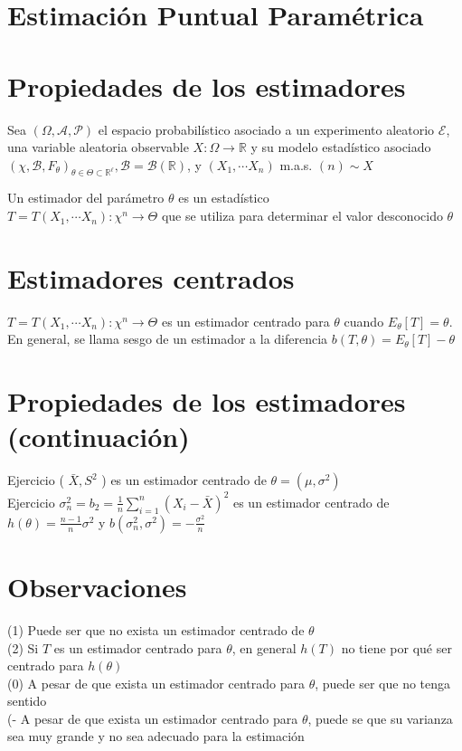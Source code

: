 \section{Estimación Puntual Paramétrica}
\section*{Propiedades de los estimadores}
Sea $(\Omega, \mathcal{A}, \mathcal{P})$ el espacio probabilístico asociado a un experimento aleatorio $\mathcal{E}$, una variable aleatoria observable $X: \Omega \longrightarrow \mathbb{R}$ y su modelo estadístico asociado $\left(\chi, \mathcal{B}, F_{\theta}\right)_{\theta \in \Theta \subset \mathbb{R}^{\ell}}, \mathcal{B}=\mathcal{B}(\mathbb{R})$, y $\left(X_{1}, \cdots X_{n}\right)$ m.a.s. $(n) \sim X$

Un estimador del parámetro $\theta$ es un estadístico\\
$T=T\left(X_{1}, \cdots X_{n}\right): \chi^{n} \longrightarrow \Theta$ que se utiliza para determinar el valor desconocido $\theta$

\section*{Estimadores centrados}
$T=T\left(X_{1}, \cdots X_{n}\right): \chi^{n} \longrightarrow \Theta$ es un estimador centrado para $\theta$ cuando $E_{\theta}[T]=\theta$. En general, se llama sesgo de un estimador a la diferencia $b(T, \theta)=E_{\theta}[T]-\theta$

\section*{Propiedades de los estimadores (continuación)}
Ejercicio ( $\bar{X}, S^{2}$ ) es un estimador centrado de $\theta=\left(\mu, \sigma^{2}\right)$\\
Ejercicio $\sigma_{n}^{2}=b_{2}=\frac{1}{n} \sum_{i=1}^{n}\left(X_{i}-\bar{X}\right)^{2}$ es un estimador centrado de $h(\theta)=\frac{n-1}{n} \sigma^{2}$ y $b\left(\sigma_{n}^{2}, \sigma^{2}\right)=-\frac{\sigma^{2}}{n}$

\section*{Observaciones}
 (1) Puede ser que no exista un estimador centrado de $\theta$\\
(2) Si $T$ es un estimador centrado para $\theta$, en general $h(T)$ no tiene por qué ser centrado para $h(\theta)$\\
(0) A pesar de que exista un estimador centrado para $\theta$, puede ser que no tenga sentido\\
(- A pesar de que exista un estimador centrado para $\theta$, puede se que su varianza sea muy grande y no sea adecuado para la estimación

